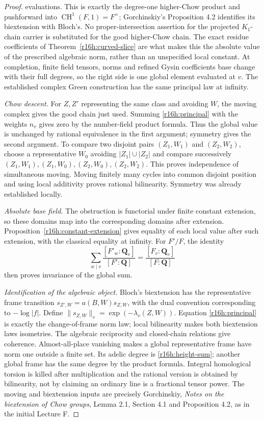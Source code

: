 \documentclass[11pt,a4paper]{article}
\theoremstyle{definition}
\theoremstyle{remark}
\numberwithin{equation}{section}
\begin{document}
\begin{proof}
evaluations. This is exactly the degree-one higher-Chow product
and pushforward into $\operatorname{CH}^1(F,1)=F^\times$;
Gorchinskiy's Proposition 4.2 identifies its biextension with
Bloch's. No proper-intersection assertion for the projected
$K_1$-chain carrier is substituted for the good higher-Chow chain.
The exact residue coefficients of Theorem~\ref{r16h:curved-slice}
are what makes this the absolute value of the prescribed algebraic
norm, rather than an unspecified local constant. At completion, finite field tensors,
norms and refined Gysin coefficients base change with their full
degrees, so the right side is one global element evaluated at $v$.
The established complex Green construction has the same principal
law at infinity.

\emph{Chow descent.}
For $Z,Z'$ representing the same class and avoiding $W$, the moving
complex gives the good chain just used. Summing
\eqref{r16h:principal} with the weights $n_v$ gives zero by the
number-field product formula. Thus the global value is unchanged
by rational equivalence in the first argument; symmetry gives the
second argument. To compare two disjoint pairs $(Z_1,W_1)$ and
$(Z_2,W_2)$, choose a representative $W_0$ avoiding
$|Z_1|\cup|Z_2|$ and compare successively
$(Z_1,W_1),(Z_1,W_0),(Z_2,W_0),(Z_2,W_2)$. This proves independence
of simultaneous moving. Moving finitely many cycles into common
disjoint position and using local additivity proves rational
bilinearity. Symmetry was already established locally.

\emph{Absolute base field.}
The obstruction is functorial under finite constant extension, so
these domains map into the corresponding domains after extension.
Proposition~\ref{r16h:constant-extension} gives equality of each
local value after such extension, with the classical equality at
infinity. For $F'/F$, the identity
\[
 \sum_{w\mid v}\frac{[F'_w:\mathbf Q_v]}{[F':\mathbf Q]}
                        =\frac{[F_v:\mathbf Q_v]}{[F:\mathbf Q]}
\]
then proves invariance of the global sum.

\emph{Identification of the algebraic object.}
Bloch's biextension has the representative frame transition
$s_{Z',W}=a(B,W)s_{Z,W}$, with the dual convention corresponding
to $-\log|f|$. Define $\|s_{Z,W}\|_v=\exp(-\lambda_v(Z,W))$.
Equation \eqref{r16h:principal} is exactly the change-of-frame norm
law; local bilinearity makes both biextension laws isometries.
The algebraic reciprocity and closed-chain relations give coherence.
Almost-all-place vanishing makes a global representative frame have
norm one outside a finite set. Its adelic degree is
\eqref{r16h:height-sum}; another global frame has the same degree
by the product formula. Integral homological torsion is killed
after multiplication and the rational version is obtained by
bilinearity, not by claiming an ordinary line is a fractional
tensor power. The moving and biextension inputs are precisely
Gorchinskiy, \emph{Notes on the biextension of Chow groups}, Lemma
2.1, Section 4.1 and Proposition 4.2, as in the initial
Lecture F.
\end{proof}
\end{document}
